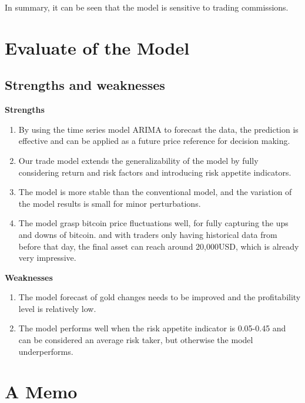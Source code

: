 \documentclass{mcmthesis}
\begin{document}
In summary, it can be seen that the model is sensitive to trading commissions.


\section{Evaluate of the Model}
\subsection{Strengths and weaknesses}
\textbf{Strengths}
\begin{enumerate}    %
  \item By using the time series model ARIMA to forecast the data, the prediction is effective and can be applied as a future price reference for decision making.
  \item Our trade model extends the generalizability of the model by fully considering return and risk factors and introducing risk appetite indicators.
  \item The model is more stable than the conventional model, and the variation of the model results is small for minor perturbations.
  \item The model grasp bitcoin price fluctuations well, for fully capturing the ups and downs of bitcoin.
  and with traders only having historical data from before that day, the final asset can reach around 20,000USD, which is already very impressive.
\end{enumerate}

\textbf{Weaknesses}
\begin{enumerate}    %
  \item The model forecast of gold changes needs to be improved and the profitability level is relatively low.
  \item The model performs well when the risk appetite indicator is 0.05-0.45 and can be considered an average risk taker, but otherwise the model underperforms.
\end{enumerate}



\section{A Memo}
\end{document}

